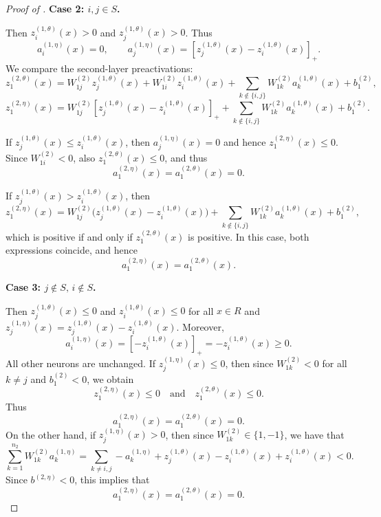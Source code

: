 \documentclass{article}
\theoremstyle{definition}
\newcommand{\weights}[1]{W^{(#1)}}
\newcommand{\bias}[1]{b^{(#1)}}
\newcommand{\activation}[1]{a^{(#1)}}
\newcommand{\preactivation}[1]{z^{(#1)}}
\begin{document}
\begin{proof}[Proof of ]
\medskip
\noindent \textbf{Case 2: $i,j \in S$.}  

Then $\preactivation{1,\theta}_i(x) > 0$ and $\preactivation{1,\theta}_j(x) > 0$. Thus
\[
\activation{1,\eta}_i(x) = 0,
\qquad
\activation{1,\eta}_j(x) = \left[\preactivation{1,\theta}_j(x) - \preactivation{1,\theta}_i(x)\right]_+.
\]
%
We compare the second-layer preactivations:
\[
\preactivation{2,\theta}_1(x)
=
\weights{2}_{1j}\preactivation{1,\theta}_j(x)
+ \weights{2}_{1i}\preactivation{1,\theta}_i(x)
+ \sum_{k \notin \{i,j\}} \weights{2}_{1k} \activation{1,\theta}_k(x)
+ \bias{2}_1,
\]
\[
\preactivation{2,\eta}_1(x)
=
\weights{2}_{1j}\left[\preactivation{1,\theta}_j(x) - \preactivation{1,\theta}_i(x)\right]_+
+ \sum_{k \notin \{i,j\}} \weights{2}_{1k} \activation{1,\theta}_k(x)
+ \bias{2}_1.
\]

If $\preactivation{1,\theta}_j(x) \le \preactivation{1,\theta}_i(x)$, then
\(
\activation{1,\eta}_j(x)=0
\)
and hence
\(
\preactivation{2,\eta}_1(x) \le 0.
\)
Since $\weights{2}_{1i} < 0$, also $\preactivation{2,\theta}_1(x) \le 0$, and thus
\[
\activation{2,\eta}_1(x) = \activation{2,\theta}_1(x) = 0.
\]

If $\preactivation{1,\theta}_j(x) > \preactivation{1,\theta}_i(x)$, then
\[
\preactivation{2,\eta}_1(x)
=
\weights{2}_{1j}\big(\preactivation{1,\theta}_j(x) - \preactivation{1,\theta}_i(x)\big)
+ \sum_{k \notin \{i,j\}} \weights{2}_{1k} \activation{1,\theta}_k(x)
+ \bias{2}_1,
\]
which is positive if and only if $\preactivation{2,\theta}_1(x)$ is positive. In this case, both expressions coincide, and hence
\[
\activation{2,\eta}_1(x) = \activation{2,\theta}_1(x).
\]

\medskip
\noindent \textbf{Case 3: $j \notin S,\, i \notin S$.}  

Then $\preactivation{1,\theta}_j(x) \le 0$ and $\preactivation{1,\theta}_i(x) \le 0$ for all $x \in R$ and $\preactivation{1,\eta}_j(x)
=
\preactivation{1,\theta}_j(x) - \preactivation{1,\theta}_i(x). $ Moreover,
\[
\activation{1,\eta}_i(x) = \left[-\preactivation{1,\theta}_i(x)\right]_+ = -\preactivation{1,\theta}_i(x) \ge 0.
\]
All other neurons are unchanged. 
%
If $\preactivation{1,\eta}_j(x) \leq 0$, then since $\weights{2}_{1k} < 0$ for all $k \neq j$ and $\bias{2}_1 < 0$, we obtain
\[
\preactivation{2,\eta}_1(x) \le 0
\quad \text{and} \quad
\preactivation{2,\theta}_1(x) \le 0.
\]
Thus
\[
\activation{2,\eta}_1(x) = \activation{2,\theta}_1(x) = 0.
\]
On the other hand, if $\preactivation{1,\eta}_j(x) > 0$, then since $\weights{2}_{1k} \in \{1,-1\}$, we have that \[\sum_{k =1}^{n_2} \weights{2}_{1k} \activation{1,\eta}_k = \sum_{k \neq i, j} -\activation{1,\eta}_k + \preactivation{1,\theta}_j(x) - \preactivation{1,\theta}_i(x) + \preactivation{1,\theta}_i(x) < 0.\] Since $\bias{2,\eta} < 0$, this implies that \[
\activation{2,\eta}_1(x) = \activation{2,\theta}_1(x) = 0.
\]


\end{proof}
\end{document}
